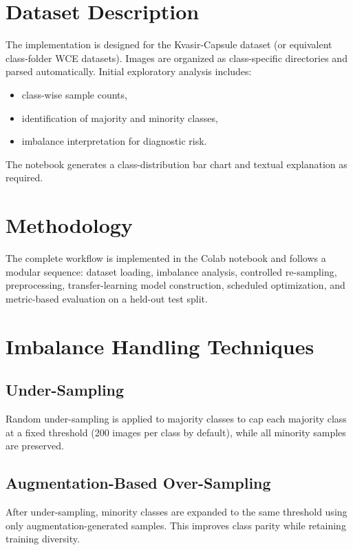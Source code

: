 \documentclass[12pt,a4paper]{article}
\begin{document}
\section{Dataset Description}
The implementation is designed for the Kvasir-Capsule dataset (or equivalent class-folder WCE datasets). Images are organized as class-specific directories and parsed automatically. Initial exploratory analysis includes:
\begin{itemize}[noitemsep]
    \item class-wise sample counts,
    \item identification of majority and minority classes,
    \item imbalance interpretation for diagnostic risk.
\end{itemize}
The notebook generates a class-distribution bar chart and textual explanation as required.

\section{Methodology}
The complete workflow is implemented in the Colab notebook and follows a modular sequence: dataset loading, imbalance analysis, controlled re-sampling, preprocessing, transfer-learning model construction, scheduled optimization, and metric-based evaluation on a held-out test split.

\section{Imbalance Handling Techniques}
\subsection{Under-Sampling}
Random under-sampling is applied to majority classes to cap each majority class at a fixed threshold (200 images per class by default), while all minority samples are preserved.

\subsection{Augmentation-Based Over-Sampling}
After under-sampling, minority classes are expanded to the same threshold using only augmentation-generated samples. This improves class parity while retaining training diversity.
\end{document}
